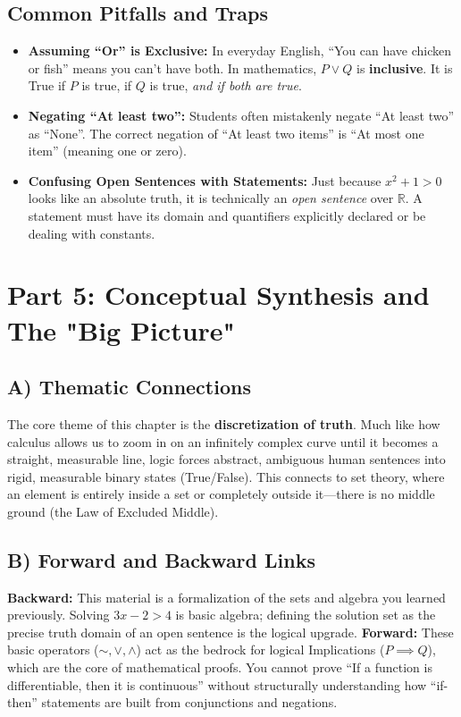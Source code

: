 \documentclass[11pt]{article}
\begin{document}
\subsection{Common Pitfalls and Traps}
\begin{itemize}
    \item \textbf{Assuming ``Or'' is Exclusive:} In everyday English, ``You can have chicken or fish'' means you can't have both. In mathematics, $P \lor Q$ is \textbf{inclusive}. It is True if $P$ is true, if $Q$ is true, \textit{and if both are true}. 
    \item \textbf{Negating ``At least two'':} Students often mistakenly negate ``At least two'' as ``None''. The correct negation of ``At least two items'' is ``At most one item'' (meaning one or zero).
    \item \textbf{Confusing Open Sentences with Statements:} Just because $x^2 + 1 > 0$ looks like an absolute truth, it is technically an \textit{open sentence} over $\mathbb{R}$. A statement must have its domain and quantifiers explicitly declared or be dealing with constants.
\end{itemize}

\section{Part 5: Conceptual Synthesis and The "Big Picture"}

\subsection{A) Thematic Connections}
The core theme of this chapter is the \textbf{discretization of truth}. Much like how calculus allows us to zoom in on an infinitely complex curve until it becomes a straight, measurable line, logic forces abstract, ambiguous human sentences into rigid, measurable binary states (True/False). This connects to set theory, where an element is entirely inside a set or completely outside it—there is no middle ground (the Law of Excluded Middle). 

\subsection{B) Forward and Backward Links}
\textbf{Backward:} This material is a formalization of the sets and algebra you learned previously. Solving $3x - 2 > 4$ is basic algebra; defining the solution set as the precise truth domain of an open sentence is the logical upgrade. 
\textbf{Forward:} These basic operators ($\sim, \lor, \land$) act as the bedrock for logical Implications ($P \implies Q$), which are the core of mathematical proofs. You cannot prove ``If a function is differentiable, then it is continuous'' without structurally understanding how ``if-then'' statements are built from conjunctions and negations.
\end{document}
